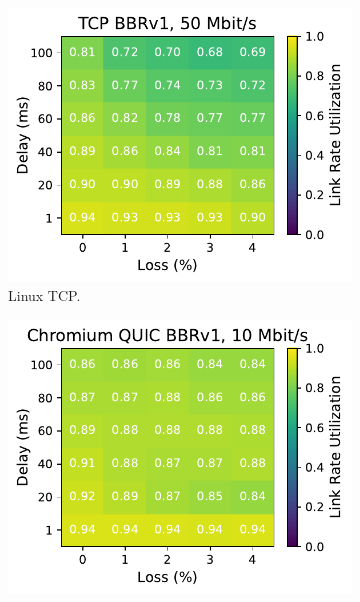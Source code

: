 \begin{figure}[ht]
\begin{subfigure}[b]{0.22\linewidth}
        \includegraphics[width=\linewidth,trim={0 0 2cm 0},clip]{splitting-paper/figures/heatmaps/heatmap_tcp_bbr1_50mbps.pdf}
        \caption{Linux TCP.}
    \end{subfigure}
    \begin{subfigure}[b]{0.22\linewidth}
        \includegraphics[width=\linewidth,trim={0 0 2cm 0},clip]{splitting-paper/figures/heatmaps/heatmap_quic_bbr1_10mbps.pdf}

\end{subfigure}
\end{figure}
